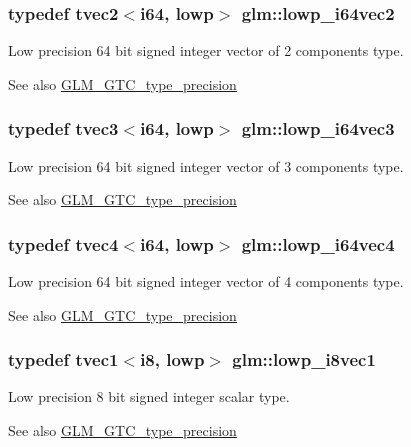 \subsubsection[{lowp\+\_\+i64vec2}]{\setlength{\rightskip}{0pt plus 5cm}typedef tvec2$<${\bf i64}, lowp$>$ {\bf glm\+::lowp\+\_\+i64vec2}}\label{namespaceglm_ac8e2d710b3b859c4609821d77fd0d5e4}
Low precision 64 bit signed integer vector of 2 components type. \begin{DoxySeeAlso}{See also}
\hyperlink{group__gtc__type__precision}{G\+L\+M\+\_\+\+G\+T\+C\+\_\+type\+\_\+precision} 
\end{DoxySeeAlso}
\hypertarget{namespaceglm_aff7ecff167a372696b99f4a5de7f2712}{}
\subsubsection[{lowp\+\_\+i64vec3}]{\setlength{\rightskip}{0pt plus 5cm}typedef tvec3$<${\bf i64}, lowp$>$ {\bf glm\+::lowp\+\_\+i64vec3}}\label{namespaceglm_aff7ecff167a372696b99f4a5de7f2712}
Low precision 64 bit signed integer vector of 3 components type. \begin{DoxySeeAlso}{See also}
\hyperlink{group__gtc__type__precision}{G\+L\+M\+\_\+\+G\+T\+C\+\_\+type\+\_\+precision} 
\end{DoxySeeAlso}
\hypertarget{namespaceglm_af879208ba37d0a2d2e6a43a138fb28cb}{}
\subsubsection[{lowp\+\_\+i64vec4}]{\setlength{\rightskip}{0pt plus 5cm}typedef tvec4$<${\bf i64}, lowp$>$ {\bf glm\+::lowp\+\_\+i64vec4}}\label{namespaceglm_af879208ba37d0a2d2e6a43a138fb28cb}
Low precision 64 bit signed integer vector of 4 components type. \begin{DoxySeeAlso}{See also}
\hyperlink{group__gtc__type__precision}{G\+L\+M\+\_\+\+G\+T\+C\+\_\+type\+\_\+precision} 
\end{DoxySeeAlso}
\hypertarget{namespaceglm_abfcc3b2b920eb25e00739cd5d0baa379}{}
\subsubsection[{lowp\+\_\+i8vec1}]{\setlength{\rightskip}{0pt plus 5cm}typedef tvec1$<${\bf i8}, lowp$>$ {\bf glm\+::lowp\+\_\+i8vec1}}\label{namespaceglm_abfcc3b2b920eb25e00739cd5d0baa379}
Low precision 8 bit signed integer scalar type. \begin{DoxySeeAlso}{See also}
\hyperlink{group__gtc__type__precision}{G\+L\+M\+\_\+\+G\+T\+C\+\_\+type\+\_\+precision} 
\end{DoxySeeAlso}
\hypertarget{namespaceglm_a51fdc711ec0659398abfa207771dfce9}{}
